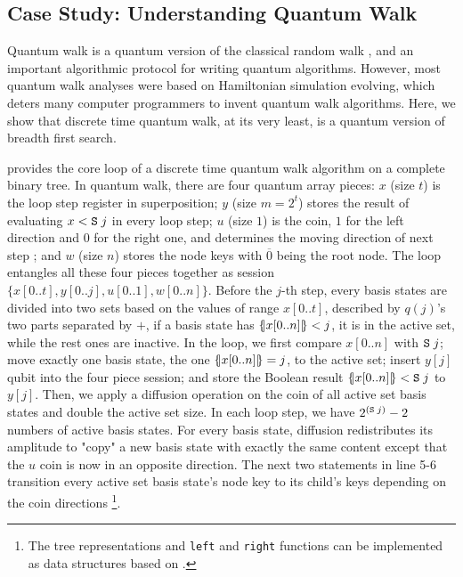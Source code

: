 \subsection{Case Study: Understanding Quantum Walk}\label{sec:quantumwalk}

Quantum walk \cite{Wong_2022,ChildsNAND,Venegas_Andraca_2012} is a quantum version of the classical random walk \cite{RayleighThePO}, and an important algorithmic protocol for writing quantum algorithms. However, most quantum walk analyses were based on Hamiltonian simulation evolving, which deters many computer programmers to invent quantum walk algorithms. Here, we show that discrete time quantum walk, at its very least, is a quantum version of breadth first search. 

 provides the core loop of a discrete time quantum walk algorithm on a complete binary tree. In quantum walk, there are four quantum array pieces: $x$ (size $t$) is the loop step register in superposition; $y$ (size $m=2^t$) stores the result of evaluating $x<\texttt{S}\;j$ in every loop step; $u$ (size $1$) is the coin, $1$ for the left direction and $0$ for the right one, and determines the moving direction of next step ; and $w$ (size $n$) stores the node keys with $\overline{0}$ being the root node. The loop entangles all these four pieces together as session $\{x[0..t],y[0..j],u[0..1],w[0..n]\}$. 
Before the $j$-th step, every basis states are divided into two sets based on the values of range $x[0..t]$, described by $q(j)$'s two parts separated by $+$, if a basis state has $\{\hspace{-0.2em}| x[0..n] |\hspace{-0.2em}\}<j$, it is in the active set, while the rest ones are inactive. In the loop, we first compare $x[0..n]$ with $\texttt{S}\;j$; move exactly one basis state, the one $\{\hspace{-0.2em}| x[0..n] |\hspace{-0.2em}\}=j$, to the active set; insert $y[j]$ qubit into the four piece session; and store the Boolean result $\{\hspace{-0.2em}| x[0..n] |\hspace{-0.2em}\}<\texttt{S}\;j$ to $y[j]$.
Then, we apply a diffusion operation on the coin of all active set basis states and double the active set size. In each loop step, we have $2^{(\texttt{S}\;j)}-2$ numbers of active basis states.
For every basis state, diffusion redistributes its amplitude to "copy" a new basis state with exactly the same content except that the $u$ coin is now in an opposite direction. 
The next two statements in  line 5-6 transition every active set basis state's node key to its child's keys depending on the coin directions \footnote{The tree representations and \texttt{left} and \texttt{right} functions can be implemented as data structures based on \oqasm.}.

